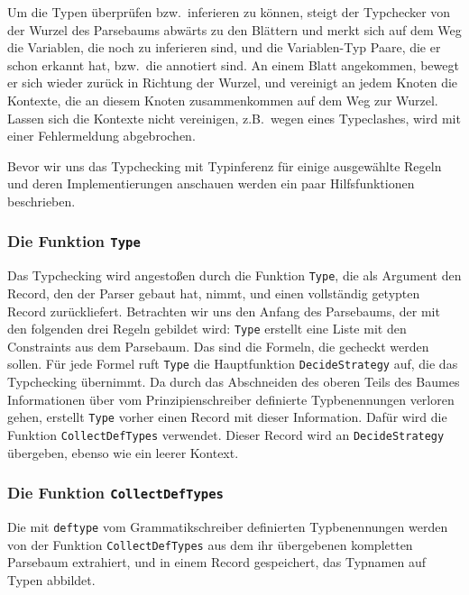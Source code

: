 Um die Typen \"uberpr\"ufen bzw.\ inferieren zu k\"onnen, steigt der
Typchecker von der Wurzel des Parsebaums abw\"arts zu den Bl\"attern
und merkt sich auf dem Weg die Variablen, die noch zu inferieren sind,
und die Variablen-Typ Paare, die er schon erkannt hat, bzw.\ die
annotiert sind. An einem Blatt angekommen, bewegt er sich wieder
zur\"uck in Richtung der Wurzel, und vereinigt an jedem Knoten die
Kontexte, die an diesem Knoten zusammenkommen auf dem Weg zur Wurzel.
Lassen sich die Kontexte nicht vereinigen, z.B.\ wegen eines
Typeclashes, wird mit einer Fehlermeldung abgebrochen.

Bevor wir uns das Typchecking mit Typinferenz f\"ur einige
ausgew\"ahlte Regeln und deren Implementierungen anschauen werden ein
paar Hilfsfunktionen beschrieben.

\subsubsection{Die Funktion {\tt Type}}

Das Typchecking wird angesto{\ss}en durch die Funktion {\tt Type}, die
als Argument den Record, den der Parser gebaut hat, nimmt, und einen
vollst\"andig getypten Record zur\"uckliefert.  Betrachten wir uns den
Anfang des Parsebaums, der mit den folgenden drei Regeln gebildet
wird:  {\tt Type} erstellt
eine Liste mit den Constraints aus dem Parsebaum. Das sind die
Formeln, die gecheckt werden sollen. F\"ur jede Formel ruft {\tt Type}
die Hauptfunktion {\tt DecideStrategy} auf, die das Typchecking
\"ubernimmt.  Da durch das Abschneiden des oberen Teils des Baumes
Informationen \"uber vom Prinzipienschreiber definierte Typbenennungen
verloren gehen, erstellt {\tt Type} vorher einen Record mit dieser
Information.  Daf\"ur wird die Funktion {\tt CollectDefTypes}
verwendet. Dieser Record wird an {\tt DecideStrategy} \"ubergeben,
ebenso wie ein leerer Kontext.

\subsubsection{Die Funktion {\tt CollectDefTypes}}\label{collectdeftypes}

Die mit {\tt deftype} vom Grammatikschreiber definierten
Typbenennungen werden von der Funktion {\tt CollectDefTypes} aus dem
ihr \"ubergebenen kompletten Parsebaum extrahiert, und in einem Record
gespeichert, das Typnamen auf Typen abbildet.


